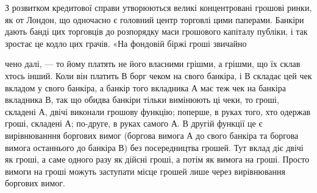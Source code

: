 З розвитком кредитової справи утворюються великі концентровані грошові
ринки, як от Лондон, що одночасно є головний центр торговлі цими паперами.
Банкіри дають банді цих торговців до розпорядку маси грошового капіталу публіки,
і так зростає це кодло цих грачів. «На фондовій біржі гроші звичайно

чено далі, — то йому платять не його власними грішми, а грішми, що їх склав хтось інший. Коли він
платить В борг чеком на свого банкіра, і В складає цей чек вкладом у свого банкіра, а банкір того
вкладника А має теж чек на банкіра вкладника В, так що обидва банкіри тільки вимінюють ці чеки,
то гроші, складені А, двічі виконали грошову функцію; поперше, в руках того, хто одержав гроші,
складені
А; по-друге, в руках самого А. В другій функції це є вирівнюванння боргових вимог (боргова вимога А
до
свого банкіра та боргова вимога останнього до банкіра В) без посередництва грошей. Тут вклад діє
двічі як гроші, а саме одного разу як дійсні гроші, а потім як вимога на гроші. Просто вимоги на
гроші можуть заступати місце грошей лише через вирівнювання боргових вимог.
